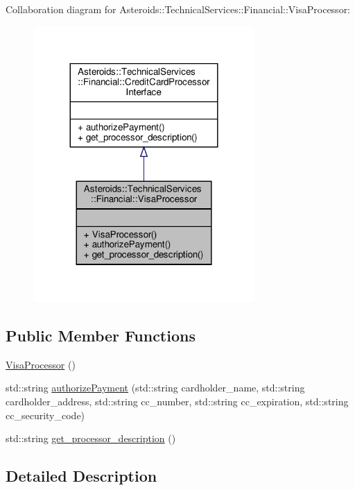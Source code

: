 Collaboration diagram for Asteroids\+:\+:Technical\+Services\+:\+:Financial\+:\+:Visa\+Processor\+:\nopagebreak
\begin{figure}[H]
\begin{center}
\leavevmode
\includegraphics[width=239pt]{classAsteroids_1_1TechnicalServices_1_1Financial_1_1VisaProcessor__coll__graph}
\end{center}
\end{figure}
\subsection*{Public Member Functions}
\begin{DoxyCompactItemize}
\item 
\hyperlink{classAsteroids_1_1TechnicalServices_1_1Financial_1_1VisaProcessor_a6b4e05f746488f0704d29402221d28b8}{Visa\+Processor} ()
\item 
std\+::string \hyperlink{classAsteroids_1_1TechnicalServices_1_1Financial_1_1VisaProcessor_ac406ab9c118fd69ea85cf423f0cb69f5}{authorize\+Payment} (std\+::string cardholder\+\_\+name, std\+::string cardholder\+\_\+address, std\+::string cc\+\_\+number, std\+::string cc\+\_\+expiration, std\+::string cc\+\_\+security\+\_\+code)
\item 
std\+::string \hyperlink{classAsteroids_1_1TechnicalServices_1_1Financial_1_1VisaProcessor_a867ad9ef829698dc57e3f71ab7778945}{get\+\_\+processor\+\_\+description} ()
\end{DoxyCompactItemize}


\subsection{Detailed Description}


